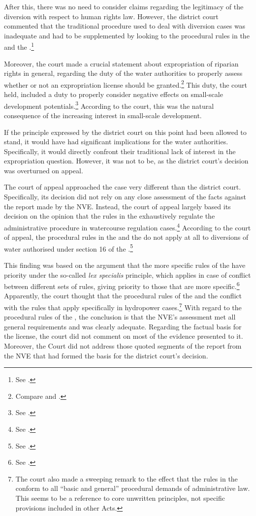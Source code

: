 After this, there was no need to consider claims regarding the legitimacy of the diversion with respect to human rights law. However, the district court commented that the traditional procedure used to deal with diversion cases was inadequate and had to be supplemented by looking to the procedural rules in the \cite{ea59} and the \cite{paa67}.\footnote{See \cite[21]{jorpeland09}.}

Moreover, the court made a crucial statement about expropriation of riparian rights in general, regarding the duty of the water authorities to properly assess whether or not an expropriation license should be granted.\footnote{Compare \dni\cite[12]{ea59} and \dni\cite[16]{paa67}.} This duty, the court held, included a duty to properly consider negative effects on small-scale development potentials.\footnote{See \cite[22]{jorpeland09}.} According to the court, this was the natural consequence of the increasing interest in small-scale development. 

If the principle expressed by the district court on this point had been allowed to stand, it would have had significant implications for the water authorities. Specifically, it would directly confront their traditional lack of interest in the expropriation question. However, it was not to be, as the district court's decision was overturned on appeal.

The court of appeal approached the case very different than the district court. Specifically, its decision did not rely on any close assessment of the facts against the report made by the NVE. Instead, the court of appeal largely based its decision on the opinion that the rules in the \cite{wra17} exhaustively regulate the administrative procedure in watercourse regulation cases.\footnote{See \cite[7]{jorpeland11a}.} According to the court of appeal, the procedural rules in the \cite{ea59} and the \cite{paa67} do not apply at all to diversions of water authorised under section 16 of the \cite{wra17}.\footnote{See \cite[7]{jorpeland11a}.} 

This finding was based on the argument that the more specific rules of the \cite{wra17} have priority under the so-called {\it lex specialis} principle, which applies in case of conflict between different sets of rules, giving priority to those that are more specific.\footnote{See \cite[7]{jorpeland11a}.} Apparently, the court thought that the procedural rules of the \cite{ea59} and the \cite{paa67} conflict with the rules that apply specifically in hydropower cases.\footnote{The court also made a sweeping remark to the effect that the rules in the \cite{wra17} conform to all ``basic and general'' procedural demands of administrative law. This seems to be a reference to core unwritten principles, not specific provisions included in other Acts.} With regard to the procedural rules of the \cite{wra17}, the conclusion is that the NVE's assessment met all general requirements and was clearly adequate. Regarding the factual basis for the license, the court did not comment on most of the evidence presented to it. Moreover, the Court did not address those quoted segments of the report from the NVE that had formed the basis for the district court's decision.

